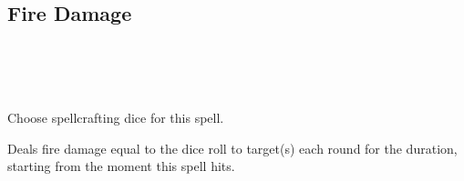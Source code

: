 \subsection*{Fire Damage}
 \\
\\
\\

Choose spellcrafting dice for this spell.

Deals fire damage equal to the dice roll to target(s) each round for the
duration, starting from the moment this spell hits.
